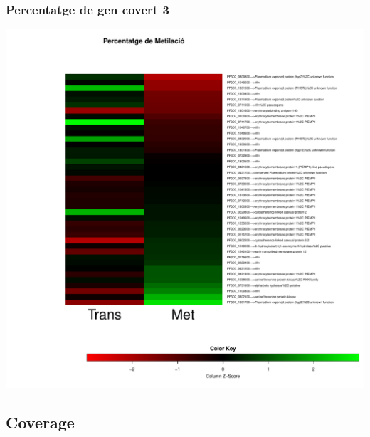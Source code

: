 \documentclass{article}\usepackage[]{graphicx}\usepackage[]{color}
\newenvironment{knitrout}{}{} %
\begin{document}
\subsubsection{Percentatge de gen covert 3}
\begin{knitrout}
\color{fgcolor}

{\centering \includegraphics[width=.9\linewidth]{figure/minimal-met_percent_3-1} 

}



\end{knitrout}
\clearpage

\subsection{Coverage}
\end{document}
